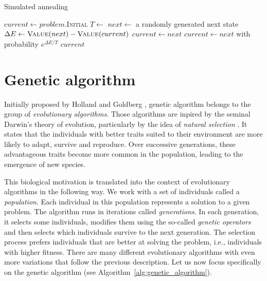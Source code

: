 \begin{algorithm}
    
    \begin{algorithmic}
    \caption{Simulated annealing} \label{alg:simulated_annealing}
    \State $current \gets problem$.I\textsc{nitial}
        \State $T \gets$ 
        \State $next \gets$ a randomly generated next state
        \State $\Delta E \gets \Call{Value}{next} - \Call{Value}{current}$
            \State $current \gets next$
        \Else
            \State $current \gets next$ with probability $e^{\Delta E / T}$
        \EndIf
    \EndFor
    \State \Return $current$
    \EndFunction
    \end{algorithmic}
\end{algorithm}

\section{Genetic algorithm} \label{sec:genetic_algorithm}


Initially proposed by Holland \cite{holland1975adaptation} and Goldberg \cite{goldberg1989genetic}, genetic algorithm \cite{russell2020artificial,vanneschi2023lectures} belongs to the group of \textit{evolutionary algorithms}. Those algorithms are inpired by the seminal Darwin's theory of evolution, particularly by the idea of \textit{natural selection} \cite{darwin1859origin}. It states that the individuals with better traits suited to their environment are more likely to adapt, survive and reproduce. Over successive generations, these advantageous traits become more common in the population, leading to the emergence of new species.

This biological motivation is translated into the context of evolutionary algorithms in the following way. We work with a set of individuals called a \textit{population}. Each individual in this population represents a solution to a given problem. The algorithm runs in iterations called \textit{generations}. In each generation, it selects some individuals, modifies them using the so-called \textit{genetic operators} and then selects which individuals survive to the next generation. The selection process prefers individuals that are better at solving the problem, i.e., individuals with higher fitness.
There are many different evolutionary algorithms with even more variations that follow the previous description. Let us now focus specifically on the genetic algorithm (see Algorithm~\ref{alg:genetic_algorithm}).

